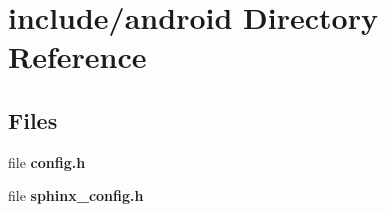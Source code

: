 \section{include/android Directory Reference}
\label{dir_035c76f7235f5f563d38e3ab90cb9716}
\subsection*{Files}
\begin{DoxyCompactItemize}
\item 
file {\bfseries config.\+h}
\item 
file {\bfseries sphinx\+\_\+config.\+h}
\end{DoxyCompactItemize}
